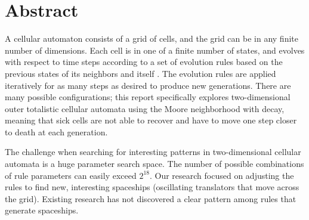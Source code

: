 \documentclass[12pt]{article}
\numberwithin{figure}{section} %
\begin{document}

\thispagestyle{plain}
\section*{\centering Abstract}

A cellular automaton consists of a grid of cells, and the grid can be in any finite number of dimensions. Each cell is in one of a finite number of states, and evolves with respect to time steps according to a set of evolution rules based on the previous states of its neighbors and itself \cite{Cellular automaton}. The evolution rules are applied iteratively for as many steps as desired to produce new generations. There are many possible configurations; this report specifically explores two-dimensional outer totalistic cellular automata using the Moore neighborhood with decay, meaning that sick cells are not able to recover and have to move one step closer to death at each generation. 

The challenge when searching for interesting patterns in two-dimensional cellular automata is a huge parameter search space. The number of possible combinations of rule parameters can easily exceed $2^{18}$. Our research focused on adjusting the rules to find new, interesting spaceships (oscillating translators that move across the grid). Existing research has not discovered a clear pattern among rules that generate spaceships. 
\end{document}
